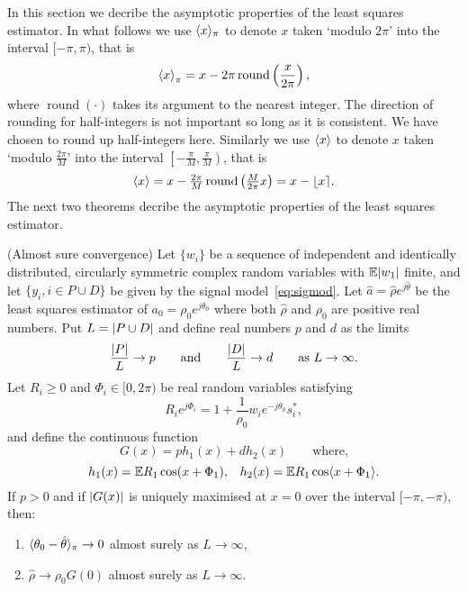 \documentclass[journal]{IEEEtran}
\begin{document}
In this section we decribe the asymptotic properties of the least squares estimator.  In what follows we use $\langle x \rangle_\pi$ to denote $x$ taken `modulo $2\pi$' into the interval $[-\pi, \pi)$, that is
\[
\left\langle x \right\rangle_\pi = x - 2\pi\operatorname{round}\left(\frac{x}{2\pi}\right),
\]
where $\operatorname{round}(\cdot)$ takes its argument to the nearest integer.  The direction of rounding for half-integers is not important so long as it is consistent.  We have chosen to round up half-integers here.  Similarly we use $\langle x \rangle$ to denote $x$ taken `modulo $\tfrac{2\pi}{M}$' into the interval $\left[-\tfrac{\pi}{M}, \tfrac{\pi}{M}\right)$, that is
\[
\left\langle x \right\rangle = x - \tfrac{2\pi}{M}\operatorname{round}\left(\tfrac{M}{2\pi}x\right) = x - {\left\lfloor x \right\rceil}.
\]
The next two theorems decribe the asymptotic properties of the least squares estimator.

\begin{theorem}\label{thm:consistency} (Almost sure convergence)
Let $\{w_i\}$ be a sequence of independent and identically distributed, circularly symmetric complex random variables with ${\mathbb E} {\left\vert w_1 \right\vert}$ finite, and let $\{y_i, i \in P \cup D\}$ be given by the signal model~\eqref{eq:sigmod}.   Let $\hat{a} = \hat{\rho}e^{j\hat{\theta}}$ be the least squares estimator of $a_0 = \rho_0e^{j\theta_0}$ where both $\hat{\rho}$ and $\rho_0$ are positive real numbers.  Put $L = {\left\vert P \cup D \right\vert}$ and define real numbers $p$ and $d$ as the limits
\[
\frac{{\left\vert P \right\vert}}{L} \rightarrow p \qquad \text{and} \qquad \frac{{\left\vert D \right\vert}}{L} \rightarrow d \qquad \text{as $L \rightarrow \infty$.}
\] 
Let $R_i \geq 0$ and $\Phi_i \in [0,2\pi)$ be real random variables satisfying
\begin{equation}\label{eq:RiandPhii}
R_ie^{j\Phi_i} = 1 + \frac{1}{\rho_0} w_i e^{-j\theta_0} s_i^*,
\end{equation}
and define the continuous function
\[
G(x) = p h_1(x) + d h_2(x) \qquad \text{where,}
\]
\[
h_1(x) = {\mathbb E} R_1 \cos(x + \Phi_1), \;\;\; h_2(x) =  {\mathbb E} R_1 \cos\langle  x + \Phi_1 \rangle.
\]
If $p > 0$ and if ${\left\vert G(x) \right\vert}$ is uniquely maximised at $x = 0$ over the interval $[-\pi,-\pi)$, then:
\begin{enumerate}
\item $\langle \theta_0 - \hat{\theta} \rangle_\pi \rightarrow 0$ almost surely as $L \rightarrow \infty$,
\item $\hat{\rho} \rightarrow \rho_0 G(0)$ almost surely as $L \rightarrow \infty$.
\end{enumerate}
\end{theorem}
\end{document}
